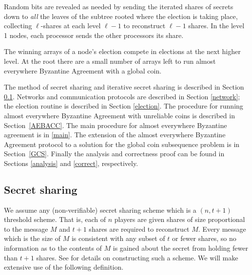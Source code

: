 \documentclass{sig-alternate}
\begin{document}
 Random bits are revealed as needed by sending the iterated shares of secrets down to {\it all}  the leaves of the subtree rooted where the election is taking place, collecting $\ell$-shares at each level $\ell-1$ to reconstruct $\ell-1$ shares.  In the level 1 nodes, each processor sends the other processors its share.

The winning arrays of a node's election compete in elections at the next higher level.
At the root there are a small number of arrays left to run almost everywhere Byzantine Agreement with a global coin.

The method of secret sharing and iterative secret sharing is described in Section \ref{secretsharing}.
Networks and communication protocols are described in Section \ref{network}; the election routine is described in Section \ref{election}.
The procedure for running almost everywhere Byzantine Agreement with unreliable coins is described in Section~\ref{AEBACC}.  The main procedure for almost everywhere Byzantine agreement is in \ref{main}.  The extension of the almost everywhere Byzantine Agreement protocol to a solution for  the global coin subsequence problem is in Section~\ref{GCS}.  Finally the analysis and correctness proof can be found in Sections \ref{analysis} and \ref{correct}, respectively.



\subsection{Secret sharing} \label{secretsharing}

We assume any (non-verifiable) secret sharing scheme which is a $(n, t+1)$  threshold scheme. That is, each of $n$ players are given shares of size
proportional to the message $M$ and $t+1$ shares are required to reconstruct $M$. Every message which is the size of $M$ is consistent with any subset of $t$ or fewer shares, so no information as to the contents of $M$ is gained about the secret from holding fewer than $t+1$ shares. See \cite{crypto} for details on constructing such a scheme.  We will make extensive use of the following definition.
\end{document}
